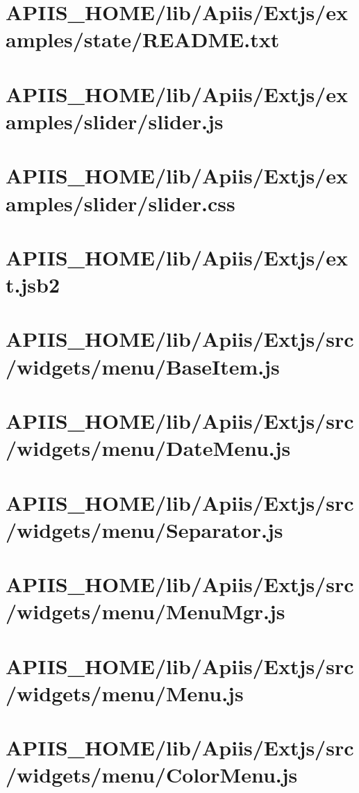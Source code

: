 \section{APIIS\_HOME/lib/Apiis/Extjs/examples/state/README.txt} 
\section{APIIS\_HOME/lib/Apiis/Extjs/examples/slider/slider.js} 
\section{APIIS\_HOME/lib/Apiis/Extjs/examples/slider/slider.css} 
\section{APIIS\_HOME/lib/Apiis/Extjs/ext.jsb2} 
\section{APIIS\_HOME/lib/Apiis/Extjs/src/widgets/menu/BaseItem.js} 
\section{APIIS\_HOME/lib/Apiis/Extjs/src/widgets/menu/DateMenu.js} 
\section{APIIS\_HOME/lib/Apiis/Extjs/src/widgets/menu/Separator.js} 
\section{APIIS\_HOME/lib/Apiis/Extjs/src/widgets/menu/MenuMgr.js} 
\section{APIIS\_HOME/lib/Apiis/Extjs/src/widgets/menu/Menu.js} 
\section{APIIS\_HOME/lib/Apiis/Extjs/src/widgets/menu/ColorMenu.js} 
